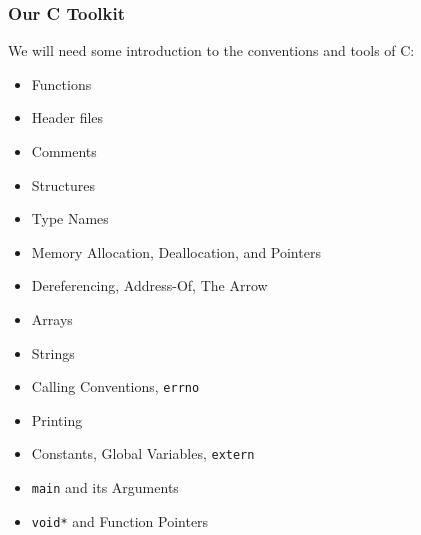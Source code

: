 \begin{frame}
	\frametitle{Our C Toolkit}

	We will need some introduction to the conventions and tools of C:
	\begin{itemize}
		\item Functions
		\item Header files
		\item Comments
		\item Structures
		\item Type Names
		\item Memory Allocation, Deallocation, and Pointers
		\item Dereferencing, Address-Of, The Arrow
		\item Arrays
		\item Strings
		\item Calling Conventions, \texttt{errno}
		\item Printing
		\item Constants, Global Variables, \texttt{extern}
		\item \texttt{main} and its Arguments
		\item \texttt{void*} and Function Pointers
	\end{itemize}


\end{frame}






